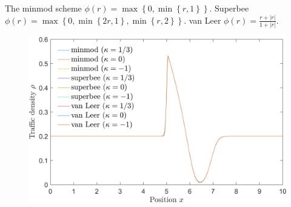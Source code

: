 \documentclass[11pt]{article}
\begin{document}

The minmod scheme $\phi(r) = \max\left\{ 0, \min\left\{r,1\right\} \right\}$. 
Superbee $\phi(r) = \max \left\{ 0, \min\left\{2r,1\right\}, \min\left\{r,2\right\} \right\} $.
van Leer $\displaystyle \phi(r) = \frac{r + |r|}{1 + |r|}$.

\begin{figure}[h!]
  \centering
  \includegraphics[width=\textwidth]{2b_all.png}
  \caption{}
  \label{fig:2b_all}
\end{figure}
\end{document}
